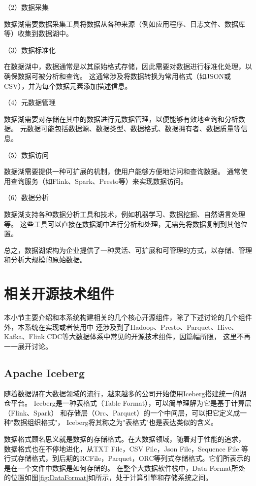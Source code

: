 （2）数据采集

数据湖需要数据采集工具将数据从各种来源（例如应用程序、日志文件、数据库等）收集到数据湖中。

（3）数据标准化

在数据湖中，数据通常是以其原始格式存储，因此需要对数据进行标准化处理，以确保数据可被分析和查询。
这通常涉及将数据转换为常用格式（如JSON或CSV），并为每个数据元素添加描述信息。

（4）元数据管理

数据湖需要对存储在其中的数据进行元数据管理，以便能够有效地查询和分析数据。
元数据可能包括数据源、数据类型、数据格式、数据拥有者、数据质量等信息。

（5）数据访问

数据湖需要提供一种可扩展的机制，使用户能够方便地访问和查询数据。
通常使用查询服务（如Flink、Spark、Presto等）来实现数据访问。

（6）数据分析

数据湖支持各种数据分析工具和技术，例如机器学习、数据挖掘、自然语言处理等。
这些工具可以直接在数据湖中进行分析和处理，无需先将数据复制到其他位置。

总之，数据湖架构为企业提供了一种灵活、可扩展和可管理的方式，以存储、管理和分析大规模的原始数据。

\section{相关开源技术组件}

本小节主要介绍和本系统构建相关的几个核心开源组件，除了下述讨论的几个组件外，本系统在实现或者使用中
还涉及到了Hadoop、Presto、Parquet、Hive、Kafka、Flink CDC等大数据体系中常见的开源技术组件，因篇幅所限，
这里不再一一展开讨论。

\subsection{Apache Iceberg}

随着数据湖在大数据领域的流行，越来越多的公司开始使用Iceberg搭建统一的湖仓平台。
Iceberg是一种表格式（Table Format），可以简单理解为它是基于计算层（Flink、Spark）
和存储层（Orc\cite{9}、Parquet\cite{10}）的一个中间层，可以把它定义成一种"数据组织格式"，
Iceberg将其称之为"表格式"也是表达类似的含义。

数据格式顾名思义就是数据的存储格式。在大数据领域，随着对于性能的追求，
数据格式也在不停地进化，从TXT File，CSV File，Json File，Sequence File
等行式存储格式，到后期的RCFile，Parquet，ORC等列式存储格式。它们所表示的是在一个文件中数据是如何存储的。
在整个大数据软件栈中，Data Format所处的位置如图\ref{fig:DataFormat}如所示，处于计算引擎和存储系统之间。

